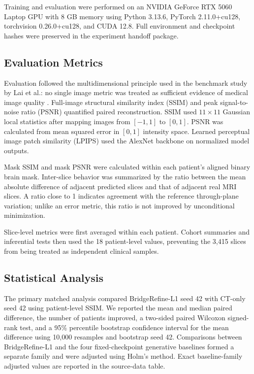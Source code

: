 Training and evaluation were performed on an NVIDIA GeForce RTX 5060 Laptop GPU with 8 GB memory using Python 3.13.6, PyTorch 2.11.0+cu128, torchvision 0.26.0+cu128, and CUDA 12.8. Full environment and checkpoint hashes were preserved in the experiment handoff package.

\subsection{Evaluation Metrics}

Evaluation followed the multidimensional principle used in the benchmark study by Lai et al.: no single image metric was treated as sufficient evidence of medical image quality \cite{lai2025stylegan}. Full-image structural similarity index (SSIM) and peak signal-to-noise ratio (PSNR) quantified paired reconstruction. SSIM used $11\times11$ Gaussian local statistics after mapping images from $[-1,1]$ to $[0,1]$. PSNR was calculated from mean squared error in $[0,1]$ intensity space. Learned perceptual image patch similarity (LPIPS) used the AlexNet backbone on normalized model outputs.

Mask SSIM and mask PSNR were calculated within each patient's aligned binary brain mask. Inter-slice behavior was summarized by the ratio between the mean absolute difference of adjacent predicted slices and that of adjacent real MRI slices. A ratio close to 1 indicates agreement with the reference through-plane variation; unlike an error metric, this ratio is not improved by unconditional minimization.

Slice-level metrics were first averaged within each patient. Cohort summaries and inferential tests then used the 18 patient-level values, preventing the 3,415 slices from being treated as independent clinical samples.

\subsection{Statistical Analysis}

The primary matched analysis compared BridgeRefine-L1 seed 42 with CT-only seed 42 using patient-level SSIM. We reported the mean and median paired difference, the number of patients improved, a two-sided paired Wilcoxon signed-rank test, and a 95\% percentile bootstrap confidence interval for the mean difference using 10,000 resamples and bootstrap seed 42. Comparisons between BridgeRefine-L1 and the four fixed-checkpoint generative baselines formed a separate family and were adjusted using Holm's method. Exact baseline-family adjusted values are reported in the source-data table.

